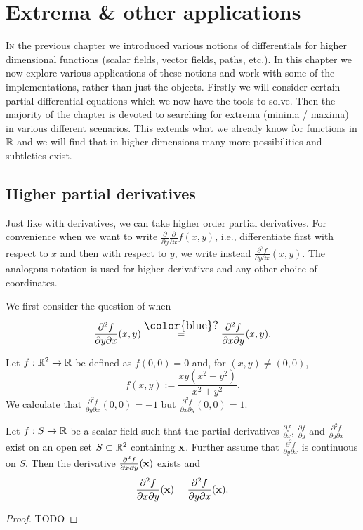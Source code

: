 \chapter{Extrema \& other applications}
\bookletstart

\lettrine{I}{n} the previous chapter we introduced various notions of differentials for higher dimensional functions (scalar fields, vector fields, paths, etc.).
In this chapter we now explore various applications of these notions and work with some of the implementations, rather than just the objects.
Firstly we will consider certain partial differential equations which we now have the tools to solve.
Then the majority of the chapter is devoted to searching for extrema (minima / maxima) in various different scenarios.
This extends what we already know for functions in \(\mathbb{R}\) and we will find that in higher dimensions many more possibilities and subtleties exist.

\section{Higher partial derivatives}
Just like with derivatives, we can take higher order partial derivatives.
For convenience when we want to write \(\frac{\partial}{\partial y}\frac{\partial}{\partial x}f(x,y) \), i.e., differentiate first with respect to \(x\) and then with respect to \(y\), we write instead \(\frac{\partial^2 f}{\partial y \partial x}(x,y) \).
The analogous notation is used for higher derivatives and any other choice of coordinates.

We first consider the question of when
\[
    \frac{\partial^2 f}{\partial y \partial x}(x,y)
    \overset{\text{\large\color{blue}?}}{=}
    \frac{\partial^2 f}{\partial x \partial y}(x,y).
\]

\begin{example*}
    Let \(f:\mathbb{R}^2 \to \mathbb{R}\) be defined as \(f(0,0)=0\) and, for \((x,y)\neq (0,0)\),
    \[
        f(x,y) := \frac{x y(x^2 - y^2)}{x^2 + y^2}.
    \]
    We calculate that \(\frac{\partial^2 f}{\partial y \partial x} (0,0) = -1\) but
    \(\frac{\partial^2 f}{\partial x \partial y}(0,0) = 1\).
\end{example*}

\begin{theorem}%
    \label{thm:equal-double-partial}
    Let \(f:S\to\mathbb{R}\) be a scalar field such that the partial derivatives \(\frac{\partial f}{\partial x }\), \(\frac{\partial f}{\partial y}\) and \(\frac{\partial^2 f}{\partial y \partial x} \) exist on an open set \(S\subset \mathbb{R}^2\) containing \(\mathbf{x}\).
    Further assume that \(\frac{\partial^2 f}{\partial y \partial x} \) is continuous on \(S\).
    Then the derivative \(\frac{\partial^2 f}{\partial x \partial y} (\mathbf{x})\) exists and
    \[
        \frac{\partial^2 f}{\partial x \partial y} (\mathbf{x})=\frac{\partial^2 f}{\partial y \partial x} (\mathbf{x}).
    \]
\end{theorem}
\begin{proof}
 TODO
\end{proof}



